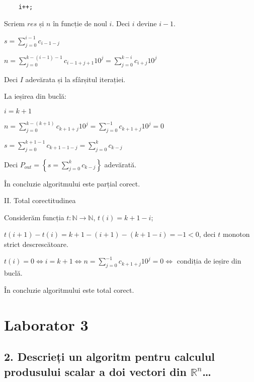 \documentclass[11pt]{article}
\begin{document}
\begin{verbatim}
    i++;
\end{verbatim}

Scriem $\mathit{res}$ și $n$ în funcție de noul $i$. Deci $i$ devine $i-1$.


$s = \sum\limits_{j=0}^{i-1}c_{i-1-j}$

$n = \sum\limits_{j=0}^{k-(i-1)-1}c_{i-1+j+1}10^{j} = \sum\limits_{j=0}^{k-i}c_{i+j}10^{j} $

Deci $I$ adevărata și la sfârșitul iterației.


\vspace{14pt}
La ieșirea din buclă:

$i = k + 1$

$n = \sum\limits_{j=0}^{k-(k+1)}c_{k+1+j}10^{j}
= \sum\limits_{j=0}^{-1}c_{k+1+j}10^{j} = 0$

$s = \sum\limits_{j=0}^{k+1-1}c_{k+1-1-j}
= \sum\limits_{j=0}^{k}c_{k-j}$

Deci $P_{out} = \left\{ s = \sum\limits_{j=0}^{k} c_{k-j} \right\} $ adevărată.

În concluzie algoritmului este parțial corect.

\vspace{14pt}
\noindent
II. Total corectitudinea
\newline

Considerăm funcția $t: \mathbb{N} \to \mathbb{N}$, $t(i) = k + 1 - i$;

$t(i + 1) - t(i) = k + 1 - (i + 1) - (k + 1 - i) = -1 < 0$, deci $t$ monoton strict descrescătoare.

$t(i) = 0 \iff i = k + 1 \iff n = \sum\limits_{j=0}^{-1}c_{k+1+j}10^{j} = 0\iff$ condiția de ieșire din buclă.

În concluzie algoritmului este total corect.

\pagebreak
\section*{Laborator 3}
\label{sec:org20158fb}
\subsection*{2. Descrieți un algoritm pentru calculul produsului scalar a doi vectori din \(\mathbb{R}^n\)\ldots{}}
\label{sec:org6c27aa0}
\end{document}
